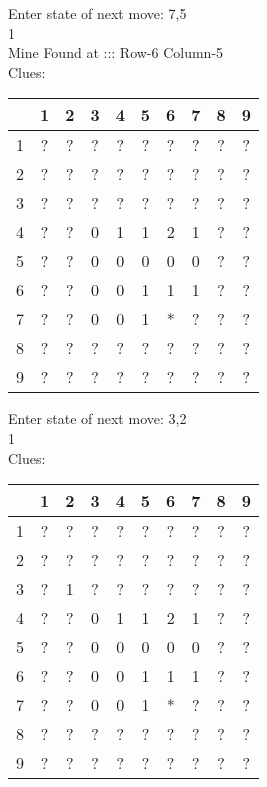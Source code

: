 Enter state of next move: 7,5\\
1\\
Mine Found at ::: Row-6 Column-5\\
Clues:\\
\begin{tabular}{|c|c|c|c|c|c|c|c|c|c|}
\hline
  & 1 & 2 & 3 & 4 & 5 & 6 & 7 & 8 & 9\\
\hline
1 & ? & ? & ? & ? & ? & ? & ? & ? & ?\\
\hline
2 & ? & ? & ? & ? & ? & ? & ? & ? & ?\\
\hline
3 & ? & ? & ? & ? & ? & ? & ? & ? & ?\\
\hline
4 & ? & ? & 0 & 1 & 1 & 2 & 1 & ? & ?\\
\hline
5 & ? & ? & 0 & 0 & 0 & 0 & 0 & ? & ?\\
\hline
6 & ? & ? & 0 & 0 & 1 & 1 & 1 & ? & ?\\
\hline
7 & ? & ? & 0 & 0 & 1 & * & ? & ? & ?\\
\hline
8 & ? & ? & ? & ? & ? & ? & ? & ? & ?\\
\hline
9 & ? & ? & ? & ? & ? & ? & ? & ? & ?\\
\hline
\end{tabular}

Enter state of next move: 3,2\\
1\\
Clues:\\
\begin{tabular}{|c|c|c|c|c|c|c|c|c|c|}
\hline
  & 1 & 2 & 3 & 4 & 5 & 6 & 7 & 8 & 9\\
\hline
1 & ? & ? & ? & ? & ? & ? & ? & ? & ?\\
\hline
2 & ? & ? & ? & ? & ? & ? & ? & ? & ?\\
\hline
3 & ? & 1 & ? & ? & ? & ? & ? & ? & ?\\
\hline
4 & ? & ? & 0 & 1 & 1 & 2 & 1 & ? & ?\\
\hline
5 & ? & ? & 0 & 0 & 0 & 0 & 0 & ? & ?\\
\hline
6 & ? & ? & 0 & 0 & 1 & 1 & 1 & ? & ?\\
\hline
7 & ? & ? & 0 & 0 & 1 & * & ? & ? & ?\\
\hline
8 & ? & ? & ? & ? & ? & ? & ? & ? & ?\\
\hline
9 & ? & ? & ? & ? & ? & ? & ? & ? & ?\\
\hline
\end{tabular}

